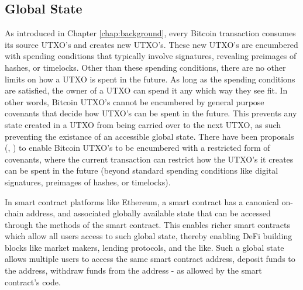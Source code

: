 \subsection{Global State}
As introduced in Chapter \ref{chap:background}, every Bitcoin transaction consumes its source UTXO's and creates new UTXO's. These new UTXO's are encumbered with spending conditions that typically involve signatures, revealing preimages of hashes, or timelocks. Other than these spending conditions, there are no other limits on how a UTXO is spent in the future. As long as the spending conditions are satisfied, the owner of a UTXO can spend it any which way they see fit. In other words, Bitcoin UTXO's cannot be encumbered by general purpose covenants that decide how UTXO's can be spent in the future. This prevents any state created in a UTXO from being carried over to the next UTXO, as such preventing the existance of an accessible global state. There have been proposals (\cite{bip119}, \cite{bip118}) to enable Bitcoin UTXO's to be encumbered with a restricted form of covenants, where the current transaction can restrict how the UTXO's it creates can be spent in the future (beyond standard spending conditions like digital signatures, preimages of hashes, or timelocks). 

In smart contract platforms like Ethereum, a smart contract has a canonical on-chain address, and associated globally available state that can be accessed through the methods of the smart contract. This enables richer smart contracts which allow all users access to such global state, thereby enabling DeFi building blocks like market makers, lending protocols, and the like. Such a global state allows multiple users to access the same smart contract address, deposit funds to the address, withdraw funds from the address - as allowed by the smart contract's code.

